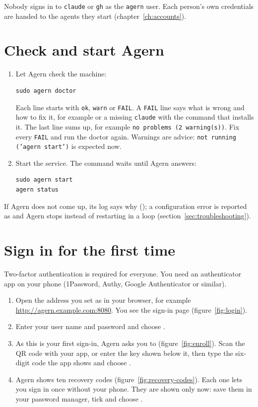 Nobody signs in to \texttt{claude} or \texttt{gh} as the \texttt{agern} user. Each person's own
credentials are handed to the agents they start (chapter~\ref{ch:accounts}).

\section{Check and start Agern}\label{sec:start}

\begin{enumerate}
  \item Let Agern check the machine:
\begin{lstlisting}
sudo agern doctor
\end{lstlisting}
    Each line starts with \texttt{ok}, \texttt{warn} or \texttt{FAIL}. A \texttt{FAIL} line says
    what is wrong and how to fix it, for example
     or a missing \texttt{claude} with the command that
    installs it. The last line sums up, for example \texttt{no problems (2 warning(s))}. Fix every
    \texttt{FAIL} and run the doctor again. Warnings are advice: \texttt{not running ('agern start')} is expected
    now.
  \item Start the service. The command waits until Agern answers:
\begin{lstlisting}
sudo agern start
agern status
\end{lstlisting}
\end{enumerate}

If Agern does not come up, its log says why (); a configuration error is reported
as  and Agern stops instead of restarting in a loop
(section~\ref{sec:troubleshooting}).

\section{Sign in for the first time}\label{sec:first-login}

Two-factor authentication is required for everyone. You need an authenticator app on your phone
(1Password, Authy, Google Authenticator or similar).

\begin{enumerate}
  \item Open the address you set as  in your browser, for example
    \url{http://agern.example.com:8080}. You see the sign-in page (figure~\ref{fig:login}).
  \item Enter your user name and password and choose .
  \item As this is your first sign-in, Agern asks you to 
    (figure~\ref{fig:enroll}). Scan the QR code with your app, or enter the key shown below it,
    then type the six-digit code the app shows and choose .
  \item Agern shows ten recovery codes (figure~\ref{fig:recovery-codes}). Each one lets you sign in
    once without your phone. They are shown only now: save them in your password manager, tick
     and choose .
\end{enumerate}

